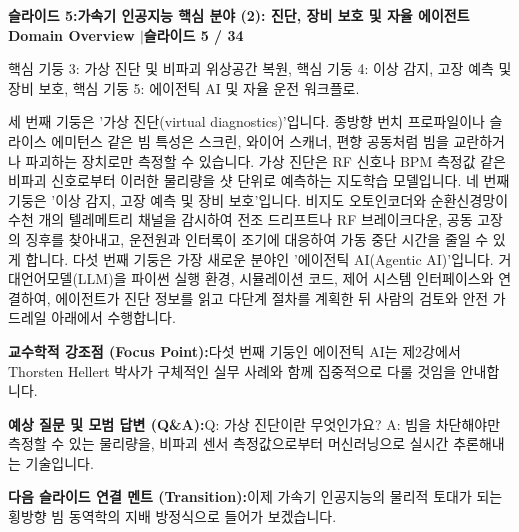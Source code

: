 \documentclass[11pt,a4paper]{article}
\begin{document}
\clearpage
\hypertarget{slide.5}{}
{}
\noindent\begin{tcolorbox}[colback=navy,colframe=navy,left=6pt,right=6pt,top=3pt,bottom=3pt,boxrule=0pt,arc=2pt]
{\large\bfseries\color{white}슬라이드 5:\enspace 가속기 인공지능 핵심 분야 (2): 진단, 장비 보호 및 자율 에이전트}\hfill{\footnotesize\bfseries\color{white!85!lightbg}Domain Overview \enspace$|$\enspace 슬라이드 5 / 34}
\end{tcolorbox}
\vspace{0.2em}
\begin{tcolorbox}[colback=lightbg,colframe=bordergray,title={\footnotesize\bfseries\color{darkgray}슬라이드 시각 구성 요약},fontupper=\small,left=6pt,right=6pt,top=2.5pt,bottom=2.5pt,boxrule=0.6pt,arc=2.5pt]
핵심 기둥 3: 가상 진단 및 비파괴 위상공간 복원, 핵심 기둥 4: 이상 감지, 고장 예측 및 장비 보호, 핵심 기둥 5: 에이전틱 AI 및 자율 운전 워크플로.
\end{tcolorbox}
\vspace{0.2em}
\begin{tcolorbox}[colback=white,colframe=primaryblue,title={\footnotesize\bfseries\color{white}발표자 구두 대본 (Spoken Script)},fontupper=\small,left=6pt,right=6pt,top=3pt,bottom=3pt,boxrule=0.8pt,arc=2.5pt]
세 번째 기둥은 '가상 진단(virtual diagnostics)'입니다. 종방향 번치 프로파일이나 슬라이스 에미턴스 같은 빔 특성은 스크린, 와이어 스캐너, 편향 공동처럼 빔을 교란하거나 파괴하는 장치로만 측정할 수 있습니다. 가상 진단은 RF 신호나 BPM 측정값 같은 비파괴 신호로부터 이러한 물리량을 샷 단위로 예측하는 지도학습 모델입니다. 네 번째 기둥은 '이상 감지, 고장 예측 및 장비 보호'입니다. 비지도 오토인코더와 순환신경망이 수천 개의 텔레메트리 채널을 감시하여 전조 드리프트나 RF 브레이크다운, 공동 고장의 징후를 찾아내고, 운전원과 인터록이 조기에 대응하여 가동 중단 시간을 줄일 수 있게 합니다. 다섯 번째 기둥은 가장 새로운 분야인 '에이전틱 AI(Agentic AI)'입니다. 거대언어모델(LLM)을 파이썬 실행 환경, 시뮬레이션 코드, 제어 시스템 인터페이스와 연결하여, 에이전트가 진단 정보를 읽고 다단계 절차를 계획한 뒤 사람의 검토와 안전 가드레일 아래에서 수행합니다.
\end{tcolorbox}
\vspace{0.2em}
\begin{tcolorbox}[colback=lightbg,colframe=bordergray,left=6pt,right=6pt,top=3pt,bottom=3pt,boxrule=0.6pt,arc=2.5pt]
\small
\noindent\textbf{\color{navy}교수학적 강조점 (Focus Point):}\enspace 다섯 번째 기둥인 에이전틱 AI는 제2강에서 Thorsten Hellert 박사가 구체적인 실무 사례와 함께 집중적으로 다룰 것임을 안내합니다.\par\vspace{0.3em}
\noindent\textbf{\color{successgreen}예상 질문 및 모범 답변 (Q\&A):}\enspace Q: 가상 진단이란 무엇인가요? A: 빔을 차단해야만 측정할 수 있는 물리량을, 비파괴 센서 측정값으로부터 머신러닝으로 실시간 추론해내는 기술입니다.\par\vspace{0.3em}
\noindent\textbf{\color{accent}다음 슬라이드 연결 멘트 (Transition):}\enspace 이제 가속기 인공지능의 물리적 토대가 되는 횡방향 빔 동역학의 지배 방정식으로 들어가 보겠습니다.
\end{tcolorbox}
\end{document}
